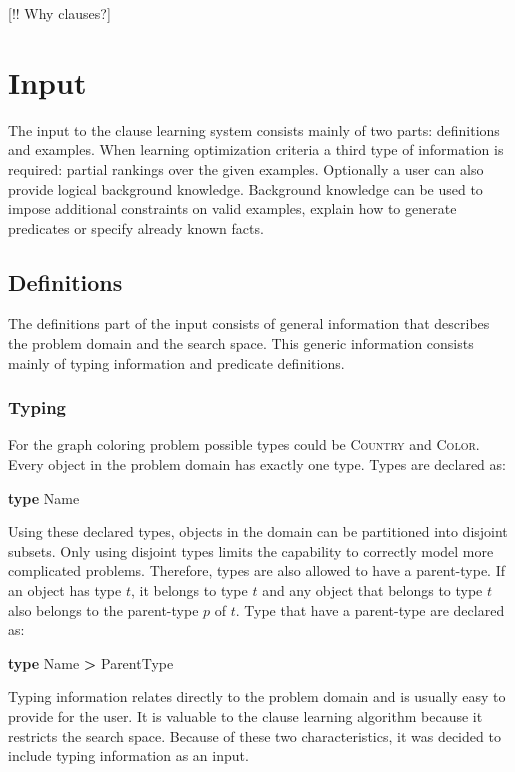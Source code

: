 [!! Why clauses?]

\section{Input}
The input to the clause learning system consists mainly of two parts: definitions and examples.
When learning optimization criteria a third type of information is required: partial rankings over the given examples.
Optionally a user can also provide logical background knowledge.
Background knowledge can be used to impose additional constraints on valid examples, explain how to generate predicates or specify already known facts.

\subsection{Definitions}
The definitions part of the input consists of general information that describes the problem domain and the search space.
This generic information consists mainly of typing information and predicate definitions.

\subsubsection{Typing}
For the graph coloring problem possible types could be \textsc{Country} and \textsc{Color}.
Every object in the problem domain has exactly one type.
Types are declared as:
\begin{demo}
\textbf{type } Name
\end{demo}
Using these declared types, objects in the domain can be partitioned into disjoint subsets.
Only using disjoint types limits the capability to correctly model more complicated problems.
Therefore, types are also allowed to have a parent-type.
If an object has type $t$, it belongs to type $t$ and any object that belongs to type $t$ also belongs to the parent-type $p$ of $t$.
Type that have a parent-type are declared as:
\begin{demo}
\textbf{type } Name \textbf{ > } ParentType
\end{demo}
Typing information relates directly to the problem domain and is usually easy to provide for the user.
It is valuable to the clause learning algorithm because it restricts the search space.
Because of these two characteristics, it was decided to include typing information as an input.

